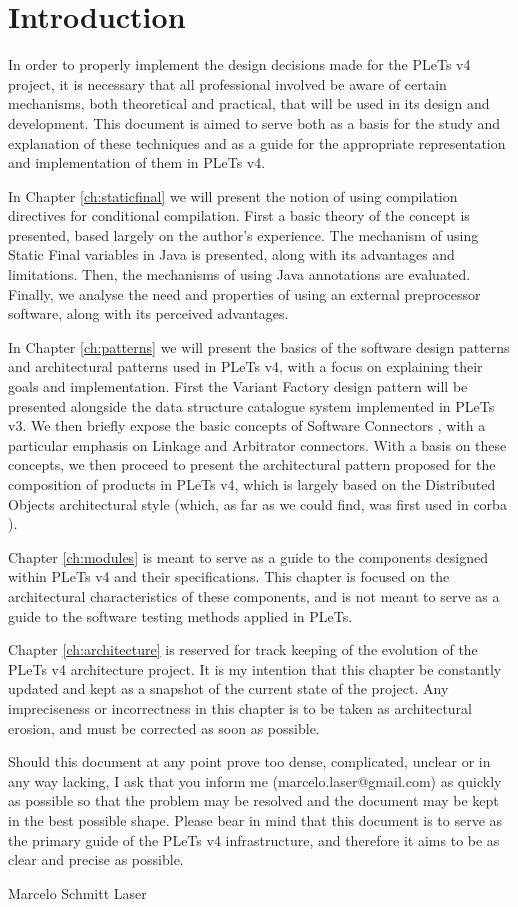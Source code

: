 \chapter*{Introduction}

In order to properly implement the design decisions made for the PLeTs v4 project, it is necessary that all professional involved be aware of certain mechanisms, both theoretical and practical, that will be used in its design and development. This document is aimed to serve both as a basis for the study and explanation of these techniques and as a guide for the appropriate representation and implementation of them in PLeTs v4.

In Chapter \ref{ch:staticfinal} we will present the notion of using compilation directives for conditional compilation. First a basic theory of the concept is presented, based largely on the author's experience. The mechanism of using Static Final variables in Java is presented, along with its advantages and limitations. Then, the mechanisms of using Java annotations are evaluated. Finally, we analyse the need and properties of using an external preprocessor software, along with its perceived advantages.

In Chapter \ref{ch:patterns} we will present the basics of the software design patterns and architectural patterns used in PLeTs v4, with a focus on explaining their goals and implementation. First the Variant Factory design pattern will be presented \cite{LASER:2015} alongside the data structure catalogue system implemented in PLeTs v3. We then briefly expose the basic concepts of Software Connectors \cite{TAYLOR:2009}, with a particular emphasis on Linkage and Arbitrator connectors. With a basis on these concepts, we then proceed to present the architectural pattern proposed for the composition of products in PLeTs v4, which is largely based on the Distributed Objects architectural style (which, as far as we could find, was first used in \acrshort{corba} \cite{CORBA:2012}).

Chapter \ref{ch:modules} is meant to serve as a guide to the components designed within PLeTs v4 and their specifications. This chapter is focused on the architectural characteristics of these components, and is not meant to serve as a guide to the software testing methods applied in PLeTs.

Chapter \ref{ch:architecture} is reserved for track keeping of the evolution of the PLeTs v4 architecture project. It is my intention that this chapter be constantly updated and kept as a snapshot of the current state of the project. Any impreciseness or incorrectness in this chapter is to be taken as architectural erosion, and must be corrected as soon as possible.

Should this document at any point prove too dense, complicated, unclear or in any way lacking, I ask that you inform me (marcelo.laser@gmail.com) as quickly as possible so that the problem may be resolved and the document may be kept in the best possible shape. Please bear in mind that this document is to serve as the primary guide of the PLeTs v4 infrastructure, and therefore it aims to be as clear and precise as possible.

Marcelo Schmitt Laser
